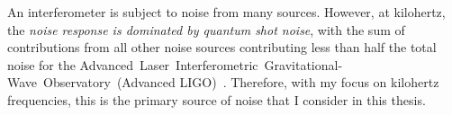
An interferometer is subject to noise from many sources. %
However, at kilohertz, the \emph{noise response is dominated by quantum shot noise}, with the sum of contributions from all other noise sources contributing less than half the total noise for the Advanced~Laser~Interferometric~Gravitational-Wave~Observatory~(Advanced LIGO)~\cite{AdvancedLIGO:2015,buikemaSensitivityPerformanceAdvanced2020}. %
Therefore, with my focus on kilohertz frequencies, this is the primary source of noise that I consider in this thesis. %


